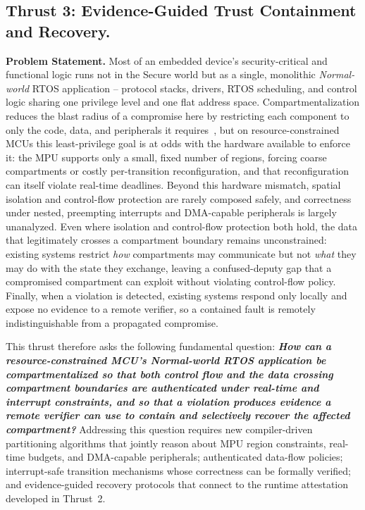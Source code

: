 \subsection{Thrust 3: Evidence-Guided Trust Containment and Recovery.}
\label{sb:t3}

\textbf{Problem Statement.}
Most of an embedded device's security-critical and functional logic runs not in the Secure world but as a single, monolithic \emph{Normal-world} RTOS application -- protocol stacks, drivers, RTOS scheduling, and control logic sharing one privilege level and one flat address space. Compartmentalization reduces the blast radius of a compromise here by restricting each component to only the code, data, and peripherals it requires~\cite{clements2018aces,kim2018securing,khan2023ec}, but on resource-constrained MCUs this least-privilege goal is at odds with the hardware available to enforce it: the MPU supports only a small, fixed number of regions, forcing coarse compartments or costly per-transition reconfiguration, and that reconfiguration can itself violate real-time deadlines. Beyond this hardware mismatch, spatial isolation and control-flow protection are rarely composed safely, and correctness under nested, preempting interrupts and DMA-capable peripherals is largely unanalyzed. Even where isolation and control-flow protection both hold, the data that legitimately crosses a compartment boundary remains unconstrained: existing systems restrict \emph{how} compartments may communicate but not \emph{what} they may do with the state they exchange, leaving a confused-deputy gap that a compromised compartment can exploit without violating control-flow policy.
Finally, when a violation is detected, existing systems respond only locally and expose no evidence to a remote verifier, so a contained fault is remotely indistinguishable from a propagated compromise.

This thrust therefore asks the following fundamental question: \textbf{\textit{How can a resource-constrained MCU's Normal-world RTOS application be compartmentalized so that both control flow and the data crossing compartment boundaries are authenticated under real-time and interrupt constraints, and so that a violation produces evidence a remote verifier can use to contain and selectively recover the affected compartment?}} Addressing this question requires new compiler-driven partitioning algorithms that jointly reason about MPU region constraints, real-time budgets, and DMA-capable peripherals; authenticated data-flow policies; interrupt-safe transition mechanisms whose correctness can be formally verified; and evidence-guided recovery protocols that connect to the runtime attestation developed in Thrust~2.

